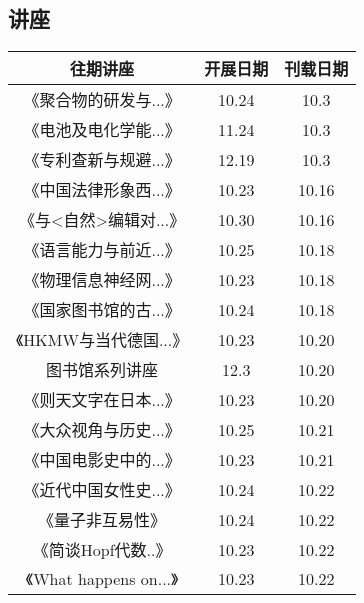 \documentclass[letterpaper, 12pt]{article}
\begin{document}
\begin{multicols}{2}

\section{讲座}
\begin{tabular}{|c|c|c|}
    \hline
    往期讲座 & 开展日期 & 刊载日期\\
    \hline\hline
        《聚合物的研发与...》 & 10.24 & 10.3\\
    《电池及电化学能...》 & 11.24 & 10.3\\
    《专利查新与规避...》 & 12.19 & 10.3\\
    《中国法律形象西...》 & 10.23 & 10.16\\
    《与<自然>编辑对...》 & 10.30 & 10.16\\
    《语言能力与前近...》 & 10.25 & 10.18\\
    《物理信息神经网...》 & 10.23 & 10.18\\
    《国家图书馆的古...》 & 10.24 & 10.18\\
    《HKMW与当代德国...》 & 10.23 & 10.20\\
    图书馆系列讲座 & 12.3 & 10.20\\
    《则天文字在日本...》 & 10.23 & 10.20\\
    《大众视角与历史...》 & 10.25 & 10.21\\
    《中国电影史中的...》 & 10.23 & 10.21\\
    《近代中国女性史...》 & 10.24 & 10.22\\
    《量子非互易性》 & 10.24 & 10.22\\
    《简谈Hopf代数..》 & 10.23 & 10.22\\
    《What happens on...》 & 10.23 & 10.22\\
    \hline
\end{tabular}


\end{multicols}
\end{document}
